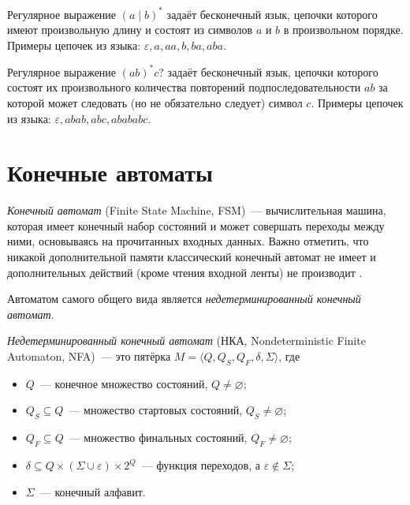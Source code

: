 \begin{example}
    Регулярное выражение $(a\mid b)^*$ задаёт бесконечный язык, цепочки которого имеют произвольную длину и состоят из символов $a$ и $b$ в произвольном порядке.
    Примеры цепочек из языка: $\varepsilon, a, aa, b, ba, aba$.
\end{example}

\begin{example}
    Регулярное выражение $(ab)^*c?$ задаёт бесконечный язык, цепочки которого состоят их произвольного количества повторений подпоследовательности $ab$ за которой может следовать (но не обязательно следует) символ $c$.
    Примеры цепочек из языка: $\varepsilon, abab, abc, abababc$.
\end{example}

\section{Конечные автоматы}

\emph{Конечный автомат} (Finite State Machine, FSM)~--- вычислительная машина, которая имеет конечный набор состояний и может совершать переходы между ними, основываясь на прочитанных входных данных.
Важно отметить, что никакой дополнительной памяти классический конечный автомат не имеет и дополнительных действий (кроме чтения входной ленты) не производит%
.

Автоматом самого общего вида является \emph{недетерминированный конечный автомат}.
\begin{definition}
    \label{def:NondeterminicticFiniteAutomata}
    \emph{Недетерминированный конечный автомат} (НКА, Nondeterministic Finite Automaton, NFA)~--- это пятёрка $M = \langle Q, Q_S, Q_F, \delta, \Sigma \rangle$, где
    \begin{itemize}
        \item $Q$~--- конечное множество состояний, $Q \neq \varnothing$;
        \item $Q_S \subseteq Q$~--- множество стартовых состояний, $Q_S \neq \varnothing$;
        \item $Q_F \subseteq Q$~--- множество финальных состояний, $Q_F \neq \varnothing$;
        \item $\delta \subseteq Q \times (\Sigma \cup \varepsilon) \times 2^Q$~--- функция переходов, а $\varepsilon \notin \Sigma$;
        \item $\Sigma$~--- конечный алфавит.
    \end{itemize}
\end{definition}

